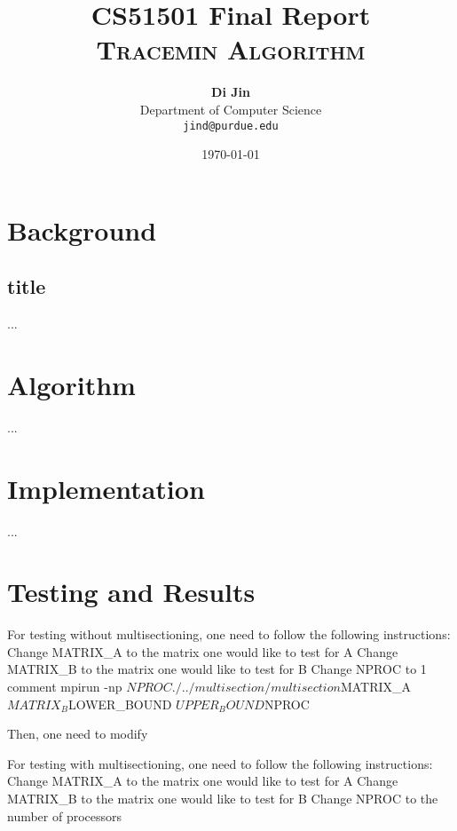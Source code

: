 \documentclass[11pt]{article}
\title{
\textbf{CS51501 Final Report} \\ \textsc{Tracemin Algorithm} \\
\normalsize\vspace{0.1in}
}
\author{
	\textbf{Di Jin} \\
	Department of Computer Science\\
	\texttt{jind@purdue.edu}
}
\date{\today}
\begin{document}
\maketitle

\section{Background}
\subsection{title}
...

\section{Algorithm}
...

\section{Implementation}
...

\section{Testing and Results}

For testing without multisectioning, one need to follow the following instructions:
Change MATRIX_A to the matrix one would like to test for A
Change MATRIX_B to the matrix one would like to test for B
Change NPROC to 1
comment mpirun -np ${NPROC} ./../multisection/multisection ${MATRIX_A} ${MATRIX_B} ${LOWER_BOUND} ${UPPER_BOUND} ${NPROC}

Then, one need to modify 

For testing with multisectioning, one need to follow the following instructions:
Change MATRIX_A to the matrix one would like to test for A
Change MATRIX_B to the matrix one would like to test for B
Change NPROC to the number of processors


%
%
\end{document}
